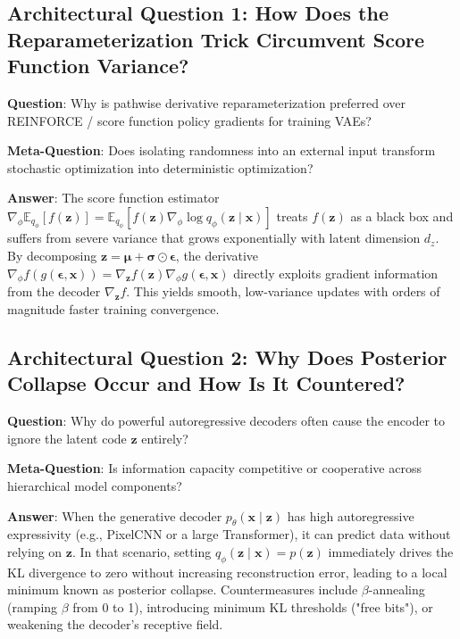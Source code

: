 \documentclass[11pt,a4paper]{article}
\theoremstyle{definition}
\begin{document}
\subsection{Architectural Question 1: How Does the Reparameterization Trick Circumvent Score Function Variance?}
\textbf{Question}: Why is pathwise derivative reparameterization preferred over REINFORCE / score function policy gradients for training VAEs?

\textbf{Meta-Question}: Does isolating randomness into an external input transform stochastic optimization into deterministic optimization?

\textbf{Answer}: The score function estimator $\nabla_\phi \mathbb{E}_{q_\phi}[f(\mathbf{z})] = \mathbb{E}_{q_\phi}[f(\mathbf{z}) \nabla_\phi \log q_\phi(\mathbf{z} \mid \mathbf{x})]$ treats $f(\mathbf{z})$ as a black box and suffers from severe variance that grows exponentially with latent dimension $d_z$. By decomposing $\mathbf{z} = \boldsymbol{\mu} + \boldsymbol{\sigma} \odot \boldsymbol{\epsilon}$, the derivative $\nabla_\phi f(g(\boldsymbol{\epsilon}, \mathbf{x})) = \nabla_{\mathbf{z}} f(\mathbf{z}) \nabla_\phi g(\boldsymbol{\epsilon}, \mathbf{x})$ directly exploits gradient information from the decoder $\nabla_{\mathbf{z}} f$. This yields smooth, low-variance updates with orders of magnitude faster training convergence.

\subsection{Architectural Question 2: Why Does Posterior Collapse Occur and How Is It Countered?}
\textbf{Question}: Why do powerful autoregressive decoders often cause the encoder to ignore the latent code $\mathbf{z}$ entirely?

\textbf{Meta-Question}: Is information capacity competitive or cooperative across hierarchical model components?

\textbf{Answer}: When the generative decoder $p_\theta(\mathbf{x} \mid \mathbf{z})$ has high autoregressive expressivity (e.g., PixelCNN or a large Transformer), it can predict data without relying on $\mathbf{z}$. In that scenario, setting $q_\phi(\mathbf{z} \mid \mathbf{x}) = p(\mathbf{z})$ immediately drives the KL divergence to zero without increasing reconstruction error, leading to a local minimum known as posterior collapse. Countermeasures include $\beta$-annealing (ramping $\beta$ from 0 to 1), introducing minimum KL thresholds ("free bits"), or weakening the decoder's receptive field.
\end{document}
